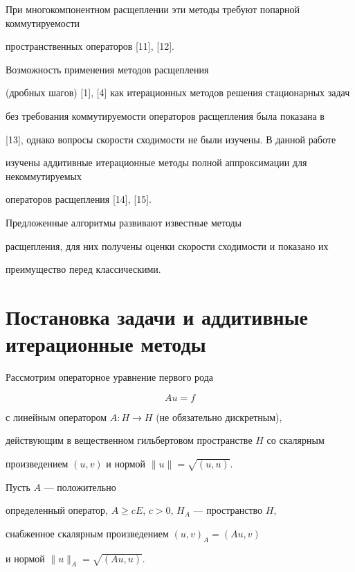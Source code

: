 При многокомпонентном расщеплении эти методы требуют попарной коммутируемости 


пространственных операторов [11], [12]. 


Возможность применения методов расщепления


(дробных шагов) [1], [4] как итерационных методов решения стационарных задач


без требования коммутируемости операторов расщепления была показана в 


[13], однако вопросы скорости сходимости не были изучены. В данной работе 


изучены аддитивные итерационные методы полной аппроксимации для некоммутируемых 


операторов расщепления [14], [15]. 


Предложенные алгоритмы развивают известные методы 


расщепления, для них получены оценки скорости сходимости и показано их 


преимущество перед классическими. 





\section{Постановка задачи и аддитивные итерационные методы}





Рассмотрим операторное уравнение первого рода


\begin{equation}


Au=f


\end{equation}


с линейным оператором $A : H \rightarrow H$ (не обязательно дискретным),


действующим в вещественном гильбертовом пространстве $H$ со скалярным


произведением $(u,v)$ и нормой $\|u\|=\sqrt{(u,u)}$.


Пусть $A$ --- положительно


определенный оператор, $A\ge cE$, $c>0$, $H_A$ --- пространство $H$,


снабженное скалярным произведением $(u,v)_A=(Au,v)$ 


и нормой $\|u\|_A=\sqrt{(Au,u)}$.





